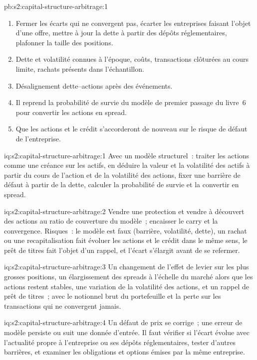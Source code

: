 \begin{solution}{pb:s2:capital-structure-arbitrage:1}
\begin{enumerate}
\item Fermer les écarts qui ne convergent pas, écarter les entreprises faisant l'objet d'une offre, mettre à jour la dette à partir des dépôts réglementaires, plafonner la taille des positions.
\item Dette et volatilité connues à l'époque, coûts, transactions clôturées au cours limite, rachats présents dans l'échantillon.
\item Désalignement dette--actions après des événements.
\item Il reprend la probabilité de survie du modèle de premier passage du livre~6 pour convertir les actions en spread.
\item Que les actions et le crédit s'accorderont de nouveau sur le risque de défaut de l'entreprise.
\end{enumerate}
\end{solution}

\begin{solution}{iq:s2:capital-structure-arbitrage:1}
Avec un modèle structurel~: traiter les actions comme une créance sur les actifs, en déduire la valeur et la volatilité des actifs à partir du cours de l'action et de la volatilité des actions, fixer une barrière de défaut
à partir de la dette, calculer la probabilité de survie et la convertir en spread.
\end{solution}

\begin{solution}{iq:s2:capital-structure-arbitrage:2}
Vendre une protection et vendre à découvert des actions au ratio de couverture du modèle~; encaisser le carry et la convergence. Risques~: le modèle est faux (barrière, volatilité, dette), un
rachat ou une recapitalisation fait évoluer les actions et le crédit dans le même sens, le prêt de titres fait l'objet d'un rappel, et l'écart s'élargit avant de se refermer.
\end{solution}

\begin{solution}{iq:s2:capital-structure-arbitrage:3}
Un changement de l'effet de levier sur les plus grosses positions, un élargissement des spreads à l'échelle du marché alors que les actions restent stables, une variation de la volatilité des actions, et un rappel de prêt de titres~; avec
le notionnel brut du portefeuille et la perte sur les transactions qui ne convergent jamais.
\end{solution}

\begin{solution}{iq:s2:capital-structure-arbitrage:4}
Un défaut de prix se corrige~; une erreur de modèle persiste ou suit une donnée d'entrée. Il faut vérifier si l'écart évolue avec l'actualité propre à l'entreprise ou ses dépôts réglementaires, tester d'autres
barrières, et examiner les obligations et options émises par la même entreprise.
\end{solution}

